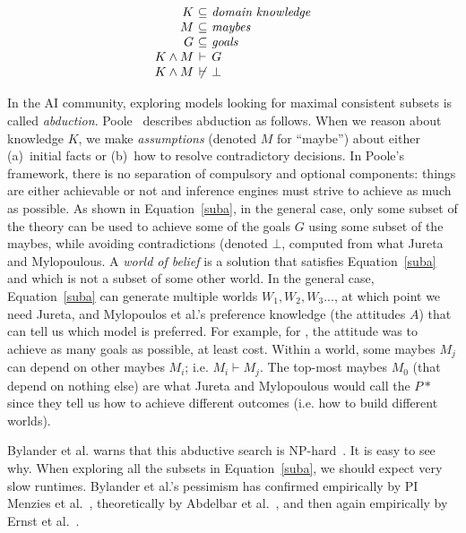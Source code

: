\begin{table} 
    {\small\begin{equation}\label{suba}
     \begin{array}{r@{~}c@{~}l}
       K &\subseteq& \mathit{domain\; knowledge} \\
       M &\subseteq& \mathit{maybes}\\    
       G &\subseteq& \mathit{goals}\\
       K \wedge M&  \vdash & G\\
       K \wedge M & \not\vdash& \bot
       \end{array}
      \end{equation}} 
\end{table}
In the AI community, exploring models looking for maximal consistent
subsets is called {\em abduction}. Poole~\cite{Poole1994} describes abduction
 as follows.
 When we reason about knowledge  $K$, we make {\em assumptions}
     (denoted $M$ for ``maybe'')
     about either (a)~initial
     facts or (b)~how to resolve contradictory decisions.
     In Poole's framework, there is no separation of  compulsory and optional components:  
     things are either achievable or not and  inference engines must strive
     to achieve as much as possible.
     As shown in Equation~\ref{suba},
     in the general case, only some subset of the theory can
     be used to achieve some of the goals $G$ using some subset of the maybes,
     while avoiding  contradictions (denoted $\bot$, computed from 
     what Jureta and Mylopoulous.
     A {\em world of belief} is a solution that
     satisfies Equation~\ref{suba} and which is not a subset of some other world.
       In the general case, Equation~\ref{suba} can generate multiple
     worlds $W_1, W_2, W_3...$, at which point we need 
     Jureta, and Mylopoulos et al.'s preference knowledge
     (the attitudes $A$) that can tell us which model is preferred. For example,
     for , the attitude was to achieve as many goals as possible,
     at least cost.
     Within a world,   some maybes $M_j$ can depend on other maybes $M_i$;
     i.e. $M_i \vdash M_j$. The top-most maybes $M_0$
     (that depend on nothing else) are what   Jureta and Mylopoulous would call
     the $P*$ since they tell us how to achieve
     different outcomes (i.e. how to build different worlds).
 
 

Bylander et al. 
 warns that this abductive search is NP-hard~\cite{Bylander1991}.
 It is easy to see why.
When exploring all the subsets in Equation~\ref{suba},
 we should expect
very slow runtimes. Bylander et al.'s pessimism
 has confirmed empirically by PI Menzies et al.~\cite{menzies1996applications}, theoretically by Abdelbar et al.~\cite{Abdelbar:2004},
and then again empirically by
Ernst et al.~\cite{ernst12caise}.

